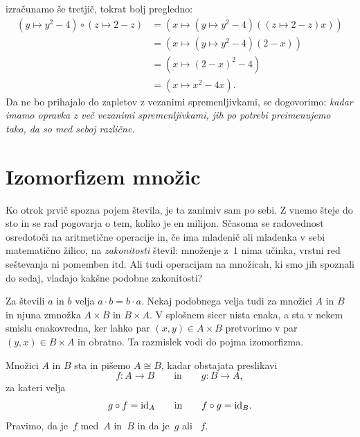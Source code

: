 %
izračunamo še tretjič, tokrat bolj pregledno:
%
\begin{align*}
  (y \mapsto y^2  - 4) \circ (z \mapsto 2 - z)
  &= (x \mapsto (y \mapsto y^2 - 4) ((z \mapsto 2 - z) x)) \\
  &= (x \mapsto (y \mapsto y^2 - 4) (2 - x)) \\
  &= (x \mapsto (2 - x)^2 - 4) \\
  &= (x \mapsto x^2 - 4 x).
\end{align*}
%
Da ne bo prihajalo do zapletov z vezanimi spremenljivkami, se dogovorimo: \emph{kadar imamo opravka z več vezanimi spremenljivkami, jih po potrebi preimenujemo tako, da so med seboj različne.}


\section{Izomorfizem množic}
\label{sec:izomorfizem-mnozic}

Ko otrok prvič spozna pojem števila, je ta zanimiv sam po sebi. Z vnemo šteje do sto in se
rad pogovarja o tem, koliko je en milijon. Sčasoma se radovednost osredotoči na
aritmetične operacije in, če ima mladenič ali mladenka v sebi matematično žilico, na
\emph{zakonitosti} števil: množenje z~$1$ nima učinka, vrstni red seštevanja ni pomemben
itd. Ali tudi operacijam na množicah, ki smo jih spoznali do sedaj, vladajo kakšne
podobne zakonitosti?

Za števili $a$ in $b$ velja $a \cdot b = b \cdot a$. Nekaj podobnega velja tudi za množici
$A$ in $B$ in njuna zmnožka $A \times B$ in $B \times A$. V splošnem sicer nista enaka, a
sta v nekem smislu enakovredna, ker lahko par $(x, y) \in A \times B$ pretvorimo v par
$(y, x) \in B \times A$ in obratno. Ta razmislek vodi do pojma izomorfizma.


\begin{definicija}
  Množici $A$ in $B$ sta  in pišemo $A \cong B$, kadar obstajata preslikavi
  \begin{equation*}
    f : A \to B
    \qquad\text{in}\qquad
    g : B \to A,
  \end{equation*}
  za kateri velja
  \begin{equation*}
    g \circ f = \id[A]
    \qquad\text{in}\qquad
    f \circ g = \id[B].
  \end{equation*}
  Pravimo, da je~$f$  med~$A$ in~$B$ in da je~$g$  ali
  ~$f$.
\end{definicija}

